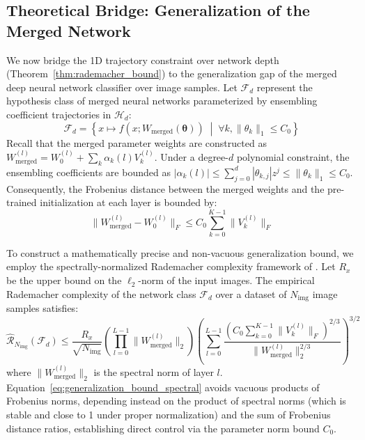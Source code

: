 \subsection{Theoretical Bridge: Generalization of the Merged Network}
We now bridge the 1D trajectory constraint over network depth (Theorem~\ref{thm:rademacher_bound}) to the generalization gap of the merged deep neural network classifier over image samples. Let $\mathcal{F}_d$ represent the hypothesis class of merged neural networks parameterized by ensembling coefficient trajectories in $\mathcal{H}_d$:
\begin{equation}
\mathcal{F}_d = \left\{ x \mapsto f\left(x; W_{\text{merged}}(\boldsymbol{\theta})\right) \;\middle|\; \forall k, \|\theta_k\|_1 \le C_0 \right\}
\end{equation}
Recall that the merged parameter weights are constructed as $W_{\text{merged}}^{(l)} = W_0^{(l)} + \sum_k \alpha_k(l) V_k^{(l)}$. Under a degree-$d$ polynomial constraint, the ensembling coefficients are bounded as $|\alpha_k(l)| \le \sum_{j=0}^d |\theta_{k,j}| z^j \le \|\theta_k\|_1 \le C_0$. Consequently, the Frobenius distance between the merged weights and the pre-trained initialization at each layer is bounded by:
\begin{equation}
\|W_{\text{merged}}^{(l)} - W_0^{(l)}\|_F \le C_0 \sum_{k=0}^{K-1} \|V_k^{(l)}\|_F
\end{equation}

To construct a mathematically precise and non-vacuous generalization bound, we employ the spectrally-normalized Rademacher complexity framework of \cite{bartlett2017spectrally}. Let $R_x$ be the upper bound on the $\ell_2$-norm of the input images. The empirical Rademacher complexity of the network class $\mathcal{F}_d$ over a dataset of $N_{\text{img}}$ image samples satisfies:
\begin{equation}
\label{eq:generalization_bound_spectral}
\widehat{\mathcal{R}}_{N_{\text{img}}}(\mathcal{F}_d) \le \frac{R_x}{\sqrt{N_{\text{img}}}} \left(\prod_{l=0}^{L-1} \|W_{\text{merged}}^{(l)}\|_2\right) \left(\sum_{l=0}^{L-1} \frac{\left( C_0 \sum_{k=0}^{K-1} \|V_k^{(l)}\|_F \right)^{2/3}}{\|W_{\text{merged}}^{(l)}\|_2^{2/3}}\right)^{3/2}
\end{equation}
where $\|W_{\text{merged}}^{(l)}\|_2$ is the spectral norm of layer $l$. Equation~\ref{eq:generalization_bound_spectral} avoids vacuous products of Frobenius norms, depending instead on the product of spectral norms (which is stable and close to 1 under proper normalization) and the sum of Frobenius distance ratios, establishing direct control via the parameter norm bound $C_0$.

